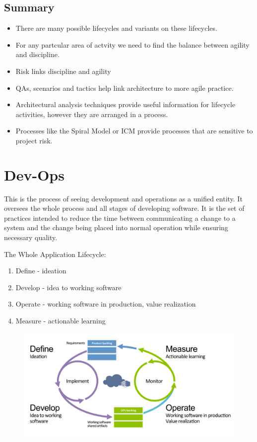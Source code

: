 \documentclass[a4paper]{article}
\begin{document}
\subsection{Summary}
\begin{itemize}
\item There are	many possible lifecycles and variants on	
these lifecycles.	
\item For any partcular	area of	actvity	we need to find the	
balance	between	agility	and	discipline.	
\item  Risk	links	discipline	and	agility	
\item QAs, scenarios and tactics help link architecture to	
more agile practice.	
\item Architectural	analysis techniques	provide	useful	
information for lifecycle activities, however they are	
arranged in	a process.	
\item Processes	like the Spiral	Model or ICM provide	
processes that are	sensitive to project risk.
\end{itemize}

\newpage
\section{Dev-Ops}
This is the process of seeing development and operations as a unified entity. It oversees the whole process and all stages of developing software. It is the set of practices intended to reduce the time between communicating a change to a system and the change being placed into normal operation while ensuring necessary quality. 

The Whole Application Lifecycle:
\begin{enumerate}
\item Define - ideation
\item Develop - idea to working software
\item Operate - working software in production, value realization 
\item Measure - actionable learning
\end{enumerate}

\begin{figure}[H]
  \hskip-0.0cm\includegraphics[scale=0.3]{images/devops.png}
\end{figure}
\end{document}
